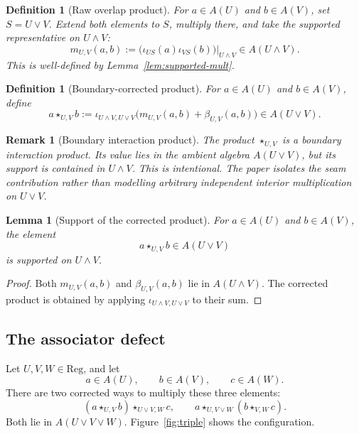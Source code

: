 \documentclass[11pt]{article}
\newtheorem{lemma}[theorem]{Lemma}
\newtheorem{definition}[theorem]{Definition}
\newtheorem{remark}[theorem]{Remark}
\newcommand{\Reg}{\mathrm{Reg}}
\begin{document}
\begin{definition}[Raw overlap product]
For \(a\in A(U)\) and \(b\in A(V)\), set \(S=U\vee V\). Extend both elements to \(S\), multiply there, and take the supported representative on \(U\wedge V\):
\[
m_{U,V}(a,b):=\bigl(\iota_{US}(a)\iota_{VS}(b)\bigr)\rvert_{U\wedge V}\in A(U\wedge V).
\]
This is well-defined by Lemma~\ref{lem:supported-mult}.
\end{definition}

\begin{definition}[Boundary-corrected product]
For \(a\in A(U)\) and \(b\in A(V)\), define
\[
a\star_{U,V} b
:=
\iota_{U\wedge V,U\vee V}\bigl(m_{U,V}(a,b)+\beta_{U,V}(a,b)\bigr)
\in A(U\vee V).
\]
\end{definition}

\begin{remark}[Boundary interaction product]
The product \(\star_{U,V}\) is a boundary interaction product. Its value lies in the ambient algebra \(A(U\vee V)\), but its support is contained in \(U\wedge V\). This is intentional. The paper isolates the seam contribution rather than modelling arbitrary independent interior multiplication on \(U\vee V\).
\end{remark}

\begin{lemma}[Support of the corrected product]
\label{lem:corrected-support}
For \(a\in A(U)\) and \(b\in A(V)\), the element
\[
a\star_{U,V}b\in A(U\vee V)
\]
is supported on \(U\wedge V\).
\end{lemma}

\begin{proof}
Both \(m_{U,V}(a,b)\) and \(\beta_{U,V}(a,b)\) lie in \(A(U\wedge V)\). The corrected product is obtained by applying \(\iota_{U\wedge V,U\vee V}\) to their sum.
\end{proof}

\subsection{The associator defect}

Let \(U,V,W\in \Reg\), and let
\[
a\in A(U),\qquad b\in A(V),\qquad c\in A(W).
\]
There are two corrected ways to multiply these three elements:
\[
(a\star_{U,V}b)\star_{U\vee V,W}c,
\qquad
 a\star_{U,V\vee W}(b\star_{V,W}c).
\]
Both lie in \(A(U\vee V\vee W)\). Figure~\ref{fig:triple} shows the configuration.
\end{document}
